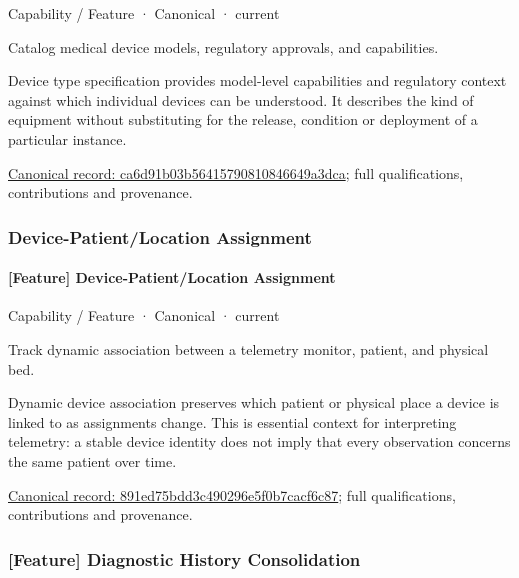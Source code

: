 \label{element:ca6d91b03b56415790810846649a3dca}
{\small Capability / Feature · Canonical · current}\par

Catalog medical device models, regulatory approvals, and capabilities.



Device type specification provides model-level capabilities and regulatory context against which individual devices can be understood. It describes the kind of equipment without substituting for the release, condition or deployment of a particular instance.


{\footnotesize \href{../../../../continuum/strategy/capability/feature/ca6d91b03b56415790810846649a3dca.md}{Canonical record: ca6d91b03b56415790810846649a3dca}; full qualifications, contributions and provenance.}\par
\subsubsection{Device-Patient/Location Assignment}

\paragraph{[Feature] Device-Patient/Location Assignment}

\label{element:891ed75bdd3c490296e5f0b7cacf6c87}
{\small Capability / Feature · Canonical · current}\par

Track dynamic association between a telemetry monitor, patient, and physical bed.



Dynamic device association preserves which patient or physical place a device is linked to as assignments change. This is essential context for interpreting telemetry: a stable device identity does not imply that every observation concerns the same patient over time.


{\footnotesize \href{../../../../continuum/strategy/capability/feature/891ed75bdd3c490296e5f0b7cacf6c87.md}{Canonical record: 891ed75bdd3c490296e5f0b7cacf6c87}; full qualifications, contributions and provenance.}\par
\subsubsection{[Feature] Diagnostic History Consolidation}

